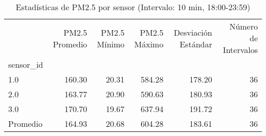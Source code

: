\begin{table}[htbp]
\centering
\caption{Estadísticas de PM2.5 por sensor (Intervalo: 10 min, 18:00-23:59)}
\label{tab:pm25_resumen}
\begin{tabular}{lrrrrr}
\toprule
{} &  PM2.5 Promedio &  PM2.5 Mínimo &  PM2.5 Máximo &  Desviación Estándar &  Número de Intervalos \\
sensor\_id &                 &               &               &                      &                       \\
\midrule
1.0       &          160.30 &         20.31 &        584.28 &               178.20 &                    36 \\
2.0       &          163.77 &         20.90 &        590.63 &               180.93 &                    36 \\
3.0       &          170.70 &         19.67 &        637.94 &               191.72 &                    36 \\
Promedio  &          164.93 &         20.68 &        604.28 &               183.61 &                    36 \\
\bottomrule
\end{tabular}
\end{table}
